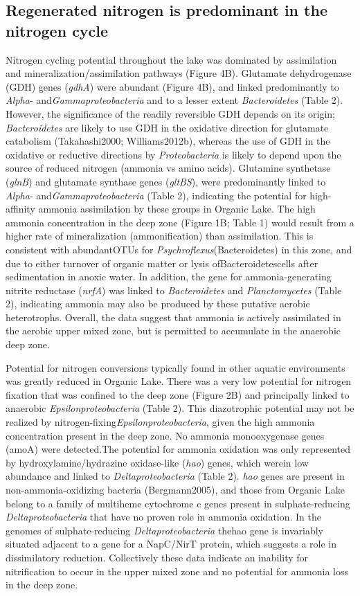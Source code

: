 {{\subsection{Regenerated nitrogen is predominant in the nitrogen cycle}
Nitrogen cycling potential throughout the lake was dominated by assimilation and mineralization/assimilation pathways (Figure 4B). 
Glutamate dehydrogenase (GDH) genes (\emph{gdhA}) were abundant (Figure 4B), and linked predominantly to \emph{Alpha}- and\emph{Gammaproteobacteria} and to a lesser extent \emph{Bacteroidetes} (Table 2). 
However, the significance of the readily reversible GDH depends on its origin; \emph{Bacteroidetes} are likely to use GDH in the oxidative direction for glutamate catabolism (Takahashi2000; Williams2012b), whereas the use of GDH in the oxidative or reductive directions by \emph{Proteobacteria} is likely to depend upon the source of reduced nitrogen (ammonia vs amino acids). 
Glutamine synthetase (\emph{glnB}) and glutamate synthase genes (\emph{gltBS}), were predominantly linked to \emph{Alpha}- and\emph{Gammaproteobacteria} (Table 2), indicating the potential for high-affinity ammonia assimilation by these groups in Organic Lake. 
The high ammonia concentration in the deep zone (Figure 1B; Table 1) would result from a higher rate of mineralization (ammonification) than assimilation. 
This is consistent with abundant\acp{OTU} for \emph{Psychroflexus}(Bacteroidetes) in this zone, and due to either turnover of organic matter or lysis ofBacteroidetescells after sedimentation in anoxic water. 
In addition, the gene for ammonia-generating nitrite reductase (\emph{nrfA}) was linked to \emph{Bacteroidetes} and \emph{Planctomycetes} (Table 2), indicating ammonia may also be produced by these putative aerobic heterotrophs. Overall, the data suggest that ammonia is actively assimilated in the aerobic upper mixed zone, but is permitted to accumulate in the anaerobic deep zone.

Potential for nitrogen conversions typically found in other aquatic environments was greatly reduced in Organic Lake. 
There was a very low potential for nitrogen fixation that was confined to the deep zone (Figure 2B) and principally linked to anaerobic \emph{Epsilonproteobacteria} (Table 2). 
This diazotrophic potential may not be realized by nitrogen-fixing\emph{Epsilonproteobacteria}, given the high ammonia concentration present in the deep zone. No ammonia monooxygenase genes (amoA) were detected.The potential for ammonia oxidation was only represented by hydroxylamine/hydrazine oxidase-like (\emph{hao}) genes, which werein low abundance and linked to \emph{Deltaproteobacteria} (Table 2). 
\emph{hao} genes are present in non-ammonia-oxidizing bacteria (Bergmann2005), and those from Organic Lake belong to a family of multiheme cytochrome c genes present in sulphate-reducing \emph{Deltaproteobacteria} that have no proven role in ammonia oxidation. 
In the genomes of sulphate-reducing \emph{Deltaproteobacteria} thehao gene is invariably situated adjacent to a gene for a NapC/NirT protein, which suggests a role in dissimilatory reduction. 
Collectively these data indicate an inability for nitrification to occur in the upper mixed zone and no potential for ammonia loss in the deep zone.

}}
